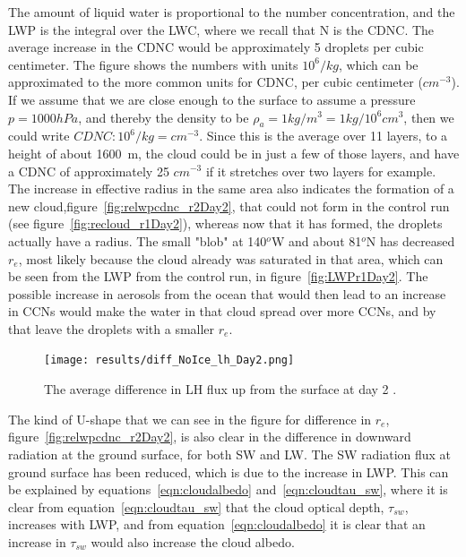 The amount of liquid water is proportional to the number concentration, and the LWP is the integral over the LWC, where we recall that N is the CDNC. The average increase in the CDNC would be approximately 5 droplets per cubic centimeter. The figure shows the numbers with units $10^6/kg$, which can be approximated to the more common units for CDNC, per cubic centimeter ($cm^{-3}$). If we assume that we are close enough to the surface to assume a pressure $p=1000hPa$, and thereby the density to be $\rho_a = 1kg/m^3=1kg/10^6cm^3$, then we could write $CDNC : 10^6/kg = cm^{-3}$. Since this is the average over 11 layers, to a height of about 1600~m, the cloud could be in just a few of those layers, and have a CDNC of approximately 25 $cm^{-3}$ if it stretches over two layers for example. The increase in effective radius in the same area also indicates the formation of a new cloud,figure~\ref{fig:relwpcdnc_r2Day2}, that could not form in the control run (see figure~\ref{fig:recloud_r1Day2}), whereas now that it has formed, the droplets actually have a radius. The small "blob" at 140$^o$W and about 81$^o$N has decreased $r_e$, most likely because the cloud already was saturated in that area, which can be seen from the LWP from the control run, in figure~\ref{fig:LWPr1Day2}. The possible increase in aerosols from the ocean that would then lead to an increase in CCNs would make the water in that cloud spread over more CCNs, and by that leave the droplets with a smaller $r_e$.

\begin{figure}
\centering
\texttt{[image: results/diff\_NoIce\_lh\_Day2.png]}
\caption{The average difference in LH flux up from the surface at day 2 .}
\label{fig:lhdiff_r2Day2}
\end{figure}


The kind of U-shape that we can see in the figure for difference in $r_e$, figure~\ref{fig:relwpcdnc_r2Day2}, is also clear in the difference in downward radiation at the ground surface, for both SW and LW. The SW radiation flux at ground surface has been reduced, which is due to the increase in LWP. This can be explained by equations~\ref{eqn:cloudalbedo} and~\ref{eqn:cloudtau_sw}, where it is clear from equation~\ref{eqn:cloudtau_sw} that the cloud optical depth, $\tau_{sw}$, increases with LWP, and from equation~\ref{eqn:cloudalbedo} it is clear that an increase in $\tau_{sw}$ would also increase the cloud albedo.

